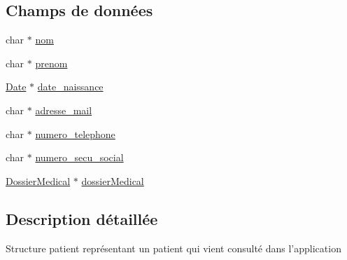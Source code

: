 \subsection*{Champs de données}
\begin{DoxyCompactItemize}
\item 
char $\ast$ \hyperlink{struct_patient_abe308d273ff51ad86ff02ef3ba3b6f0e}{nom}
\item 
char $\ast$ \hyperlink{struct_patient_aa7d0e9e8505d2ac627777c4168573ec9}{prenom}
\item 
\hyperlink{struct_date}{Date} $\ast$ \hyperlink{struct_patient_a1ce5c592705142193b097a1bed2794e6}{date\-\_\-naissance}
\item 
char $\ast$ \hyperlink{struct_patient_aefa944e4b78fb9e14c4f6e49605bba2c}{adresse\-\_\-mail}
\item 
char $\ast$ \hyperlink{struct_patient_ac65f93b2b15c34c800c05832e346c98f}{numero\-\_\-telephone}
\item 
char $\ast$ \hyperlink{struct_patient_a49bbab73f86aafe9ee3ef4b862946698}{numero\-\_\-secu\-\_\-social}
\item 
\hyperlink{struct_dossier_medical}{Dossier\-Medical} $\ast$ \hyperlink{struct_patient_a7b81f4ba7de896fa37673d677977cedf}{dossier\-Medical}
\end{DoxyCompactItemize}


\subsection{Description détaillée}
Structure patient représentant un patient qui vient consulté dans l'application 

